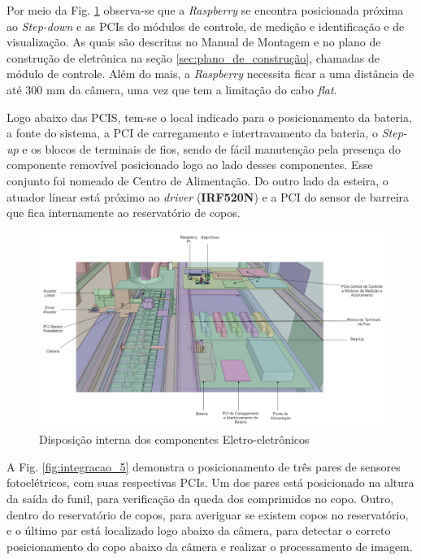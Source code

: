  Por meio da Fig. \ref{fig:integracao_3} observa-se que a \textit{Raspberry} se encontra posicionada próxima
 ao \textit{Step-down} e as PCIs do módulos de controle, de medição e identificação e de visualização. As quais são descritas no Manual de Montagem e no plano de construção de eletrônica na seção \ref{sec:plano_de_construção}, chamadas de módulo de controle. Além do mais, a \textit{Raspberry} necessita ficar a uma distância de até 300 mm da câmera, uma vez que tem a limitação do cabo \textit{flat}. 
 
 Logo abaixo das PCIS, tem-se o local indicado para o posicionamento da bateria, a fonte do sistema, a PCI de carregamento e intertravamento da bateria, o \textit{Step-up} e os blocos de terminais de fios, sendo de fácil manutenção pela presença do componente removível posicionado logo ao lado desses componentes. Esse conjunto foi nomeado de Centro de Alimentação. Do outro lado da esteira, o atuador linear  está próximo ao \textit{driver} (\textbf{IRF520N}) e a PCI do sensor de barreira que fica internamente ao reservatório de copos. 
    \begin{figure}[H]
        \centering
        \includegraphics[width=\textwidth]{figuras/integracao/Integracao_3.png} 
        \caption{Disposição interna dos componentes Eletro-eletrônicos}
        \label{fig:integracao_3}
    \end{figure}
    
    \hspace{5cm}
    
    A Fig. \ref{fig:integracao_5} demonstra o posicionamento de três pares de sensores fotoelétricos, com suas respectivas PCIs. Um dos pares está posicionado na altura da saída do funil, para verificação da queda dos comprimidos no copo. Outro, dentro do reservatório de copos, para averiguar se existem copos no reservatório, e o último par está localizado logo abaixo da câmera, para detectar o correto posicionamento do copo abaixo da câmera e realizar o processamento de imagem. 
    
